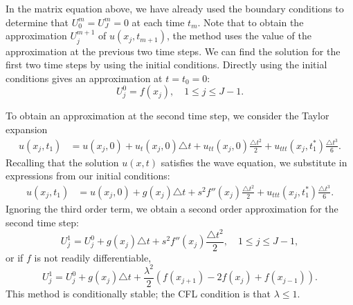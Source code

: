 In the matrix equation above, we have already used the boundary conditions to determine that 
$U_{0}^{m} = U_{J}^{m} = 0$ at each time $t_m$. 
Note that to obtain the approximation $U_{j}^{m+1}$ of $u(x_j,t_{m+1})$, the method uses the value of the approximation at the previous two time steps. We can find the solution for the first two time steps by using the initial conditions. Directly using the initial conditions gives an approximation at $t = t_0 = 0:$
\[
U_{j}^{0} = f(x_j), \quad 1 \leq j \leq J-1.
\]

To obtain an approximation at the second time step, we consider the Taylor expansion 
\begin{align*}
	u(x_j,t_1) &= u(x_j, 0) + u_t(x_j,0) \triangle t + u_{tt}(x_j,0) \frac{\triangle t^2}{2} + u_{ttt}(x_j,t_1^*) \frac{\triangle t^3}{6}.
\end{align*}
Recalling that the solution $u(x,t)$ satisfies the wave equation, we substitute in expressions from our initial conditions: 
\begin{align*}
	u(x_j,t_1) &= u(x_j, 0) +  g(x_j) \triangle t+ s^2 f''(x_j)\frac{\triangle t^2}{2} +  u_{ttt}(x_j,t_1^*) \frac{\triangle t^3}{6}.
\end{align*}
Ignoring the third order term, we obtain a second order approximation for the second time step: 
\[
U_{j}^{1}= U_{j}^{0} + g(x_j) \triangle t+ s^2 f''(x_j) \frac{\triangle t^2}{2}, \quad 1 \leq j \leq J-1,
\]
or if $f$ is not readily differentiable,
\[
U_{j}^{1}= U_{j}^{0} + g(x_j) \triangle t+ \frac{\lambda^2}{2} (f(x_{j+1}) -2 f(x_{j}) + f(x_{j-1})).
\]
This method is conditionally stable; the CFL condition is that $\lambda \leq 1$.



